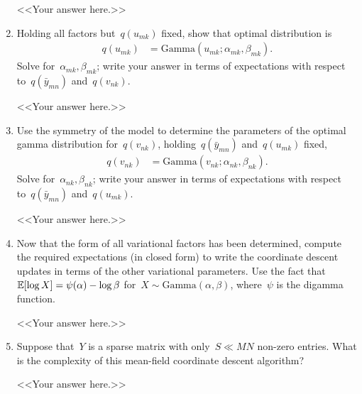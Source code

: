 \documentclass[11pt]{article}
\begin{document}
\begin{enumerate}[label=(\alph*)]
    \begin{solution}
    <<Your answer here.>>
    \end{solution}
    
    \item Holding all factors but~$q(u_{mk})$ fixed, show that optimal distribution is
    \begin{align*}
        q(u_{mk}) 
        &= \mathrm{Gamma}(u_{mk}; \alpha_{mk}, \beta_{mk}).
    \end{align*}
    Solve for~$\alpha_{mk}, \beta_{mk}$; write your answer in terms of expectations with respect to~$q(\bar{y}_{mn})$ and~$q(v_{nk})$.
    
    \begin{solution}
    <<Your answer here.>>
    \end{solution}
    
    \item Use the symmetry of the model to determine the parameters of the optimal gamma distribution for~$q(v_{nk})$, holding~$q(\bar{y}_{mn})$ and~$q(u_{mk})$ fixed,
    \begin{align*}
        q(v_{nk}) &= \mathrm{Gamma}(v_{nk}; \alpha_{nk}, \beta_{nk}).
    \end{align*}
    Solve for~$\alpha_{nk}, \beta_{nk}$; write your answer in terms of expectations with respect to~$q(\bar{y}_{mn})$ and~$q(u_{mk})$.
    
    \begin{solution}
    <<Your answer here.>>
    \end{solution}
    
    \item Now that the form of all variational factors has been determined, compute the required expectations (in closed form) to write the coordinate descent updates in terms of the other variational parameters.  Use the fact that~$\mathbb{E}[\log X] = \psi(\alpha) - \log \beta$ for~$X \sim \mathrm{Gamma}(\alpha, \beta)$, where~$\psi$ is the digamma function.
    
    \begin{solution}
    <<Your answer here.>>
    \end{solution}
    
    \item Suppose that~$Y$ is a sparse matrix with only~$S \ll MN$ non-zero entries.  What is the complexity of this mean-field coordinate descent algorithm?
    
    \begin{solution}
    <<Your answer here.>>
    \end{solution}
    
\end{enumerate}
\end{document}
